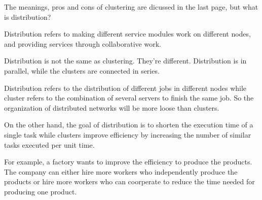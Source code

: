 \documentclass[12pt, a4paper]{article}
\begin{document}
The meanings, pros and cons of clustering are dicussed in the last page, but what is distribution?

Distribution refers to making different service modules work on different nodes, and providing services through collaborative work.

Distribution is not the same as clustering. They're different. Distribution is in parallel, while the clusters are connected in series.

Distribution refers to the distribution of different jobs in different nodes while cluster refers to the combination of several servers to finish the same job. So the organization of distributed networks will be more loose than clusters.

On the other hand, the goal of distribution is to shorten the execution time of a single task while clusters improve efficiency by increasing the number of similar tasks executed per unit time.

For example, a factory wants to improve the efficiency to produce the products. The company can either hire more workers who independently produce the products or hire more workers who can coorperate to reduce the time needed for producing one product.
\end{document}
